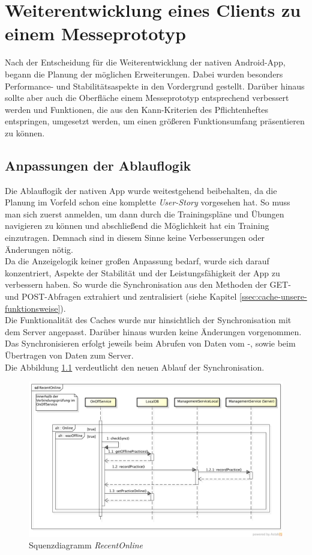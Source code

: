 \chapter{Weiterentwicklung eines Clients zu einem Messeprototyp}
\label{cha:weiterentwicklung-messeprototyp}
Nach der Entscheidung für die Weiterentwicklung der nativen Android-App, begann die Planung der möglichen Erweiterungen. Dabei wurden besonders Performance- und Stabilitätsaspekte in den Vordergrund gestellt. Darüber hinaus sollte aber auch die Oberfläche einem Messeprototyp entsprechend verbessert werden und Funktionen, die aus den Kann-Kriterien des Pflichtenheftes entspringen, umgesetzt werden, um einen größeren Funktionsumfang präsentieren zu können.

\section{Anpassungen der Ablauflogik}
\label{sec:anpassungen-ablauflogik}
Die Ablauflogik der nativen App wurde weitestgehend beibehalten, da die Planung im Vorfeld schon eine komplette \textit{User-Story} vorgesehen hat. So muss man sich zuerst anmelden, um dann durch die Trainingspläne und Übungen navigieren zu können und abschließend die Möglichkeit hat ein Training einzutragen. Demnach sind in diesem Sinne keine Verbesserungen oder Änderungen nötig.\\
Da die Anzeigelogik keiner großen Anpassung bedarf, wurde sich darauf konzentriert, Aspekte der  Stabilität und der Leistungsfähigkeit der App zu verbessern haben. So wurde die Synchronisation aus den Methoden der GET- und POST-Abfragen extrahiert und zentralisiert (siehe Kapitel \ref{ssec:cache-unsere-funktionsweise}).\\
Die Funktionalität des Caches wurde nur hinsichtlich der Synchronisation mit dem Server angepasst. Darüber hinaus wurden keine Änderungen vorgenommen. Das Synchronisieren erfolgt jeweils beim Abrufen von Daten vom -, sowie beim Übertragen von Daten zum Server.\\
Die Abbildung \ref{pic:nat-RecentOnline} verdeutlicht den neuen Ablauf der Synchronisation. \\
\begin{figure}[!h]
\centering
\includegraphics[width=\linewidth]{content/images/fITNat-RecentOnline}
\caption{Squenzdiagramm \textit{RecentOnline}}
\label{pic:nat-RecentOnline}
\end{figure}

